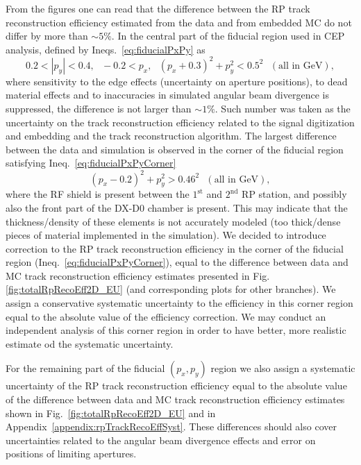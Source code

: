 From the figures one can read that the difference between the RP track reconstruction efficiency estimated from the data and from embedded MC do not differ by more than $\sim5\%$. In the central part of the fiducial region used in CEP analysis, defined by Ineqs.~\eqref{eq:fiducialPxPy} as
\begin{equation}\label{eq:fiducialPxPy}
 0.2<|p_{y}|<0.4,~~~-0.2<p_{x},~~~(p_{x}+0.3)^{2}+p_{y}^{2}<0.5^{2}~~~(\text{all in GeV}),
\end{equation}
where sensitivity to the edge effects (uncertainty on aperture positions), to dead material effects and to inaccuracies in simulated angular beam divergence is suppressed, the difference is not larger than $\sim1\%$. Such number was taken as the uncertainty on the track reconstruction efficiency related to the signal digitization and embedding and the track reconstruction algorithm. The largest difference between the data and simulation is observed in the corner of the fiducial region satisfying Ineq.~\eqref{eq:fiducialPxPyCorner}
\begin{equation}\label{eq:fiducialPxPyCorner}
(p_{x}-0.2)^{2}+p_{y}^{2}>0.46^{2}~~~(\text{all in GeV}),
\end{equation}
where the RF shield is present between the $1^{\text{st}}$ and $2^{\text{nd}}$ RP station, and possibly also the front part of the DX-D0 chamber is present. This may indicate that the thickness/density of these elements is not accurately modeled (too thick/dense pieces of material implemented in the simulation). %
We decided to introduce correction to the RP track reconstruction efficiency in the corner of the fiducial region (Ineq.~\ref{eq:fiducialPxPyCorner}), equal to the difference between data and MC track reconstruction efficiency estimates presented in Fig.\ref{fig:totalRpRecoEff2D_EU} (and corresponding plots for other branches). We assign a conservative systematic uncertainty to the efficiency in this corner region equal to the absolute value of the efficiency correction. We may conduct an independent analysis of this corner region in order to have better, more realistic estimate od the systematic uncertainty.


For the remaining part of the fiducial $(p_{x},p_{y})$ region we also assign a systematic uncertainty of the RP track reconstruction efficiency equal to the absolute value of the difference between data and MC track reconstruction efficiency estimates shown in Fig.~\ref{fig:totalRpRecoEff2D_EU} and in Appendix~\ref{appendix:rpTrackRecoEffSyst}. These differences should also cover uncertainties related to the angular beam divergence effects and error on positions of limiting apertures.















